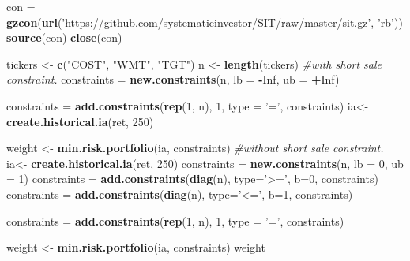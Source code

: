 \documentclass[]{article}
\newenvironment{Shaded}{\begin{snugshade}}{\end{snugshade}}
\newcommand{\CommentTok}[1]{\textcolor[rgb]{0.56,0.35,0.01}{\textit{#1}}}
\newcommand{\DataTypeTok}[1]{\textcolor[rgb]{0.13,0.29,0.53}{#1}}
\newcommand{\DecValTok}[1]{\textcolor[rgb]{0.00,0.00,0.81}{#1}}
\newcommand{\KeywordTok}[1]{\textcolor[rgb]{0.13,0.29,0.53}{\textbf{#1}}}
\newcommand{\NormalTok}[1]{#1}
\newcommand{\OperatorTok}[1]{\textcolor[rgb]{0.81,0.36,0.00}{\textbf{#1}}}
\newcommand{\OtherTok}[1]{\textcolor[rgb]{0.56,0.35,0.01}{#1}}
\newcommand{\StringTok}[1]{\textcolor[rgb]{0.31,0.60,0.02}{#1}}
\begin{document}
\begin{Shaded}
\begin{Highlighting}[]
\NormalTok{con =}\StringTok{ }\KeywordTok{gzcon}\NormalTok{(}\KeywordTok{url}\NormalTok{(}\StringTok{'https://github.com/systematicinvestor/SIT/raw/master/sit.gz'}\NormalTok{, }\StringTok{'rb'}\NormalTok{))}
\KeywordTok{source}\NormalTok{(con)}
\KeywordTok{close}\NormalTok{(con)}

\NormalTok{tickers <-}\StringTok{ }\KeywordTok{c}\NormalTok{(}\StringTok{"COST"}\NormalTok{, }\StringTok{"WMT"}\NormalTok{, }\StringTok{"TGT"}\NormalTok{)}
\NormalTok{n <-}\StringTok{ }\KeywordTok{length}\NormalTok{(tickers)}
\CommentTok{#with short sale constraint.}
\NormalTok{constraints =}\StringTok{ }\KeywordTok{new.constraints}\NormalTok{(n, }\DataTypeTok{lb =} \OperatorTok{-}\OtherTok{Inf}\NormalTok{, }\DataTypeTok{ub =} \OperatorTok{+}\OtherTok{Inf}\NormalTok{)}

\NormalTok{constraints =}\StringTok{ }\KeywordTok{add.constraints}\NormalTok{(}\KeywordTok{rep}\NormalTok{(}\DecValTok{1}\NormalTok{, n), }\DecValTok{1}\NormalTok{, }\DataTypeTok{type =} \StringTok{'='}\NormalTok{, constraints)        }
\NormalTok{ia<-}\StringTok{ }\KeywordTok{create.historical.ia}\NormalTok{(ret, }\DecValTok{250}\NormalTok{)}

\NormalTok{weight <-}\StringTok{ }\KeywordTok{min.risk.portfolio}\NormalTok{(ia, constraints)}
\CommentTok{#without short sale constraint.}
\NormalTok{ia<-}\StringTok{ }\KeywordTok{create.historical.ia}\NormalTok{(ret, }\DecValTok{250}\NormalTok{)}
\NormalTok{constraints =}\StringTok{ }\KeywordTok{new.constraints}\NormalTok{(n, }\DataTypeTok{lb =} \DecValTok{0}\NormalTok{, }\DataTypeTok{ub =} \DecValTok{1}\NormalTok{)}
\NormalTok{constraints =}\StringTok{ }\KeywordTok{add.constraints}\NormalTok{(}\KeywordTok{diag}\NormalTok{(n), }\DataTypeTok{type=}\StringTok{'>='}\NormalTok{, }\DataTypeTok{b=}\DecValTok{0}\NormalTok{, constraints)}
\NormalTok{constraints =}\StringTok{ }\KeywordTok{add.constraints}\NormalTok{(}\KeywordTok{diag}\NormalTok{(n), }\DataTypeTok{type=}\StringTok{'<='}\NormalTok{, }\DataTypeTok{b=}\DecValTok{1}\NormalTok{, constraints)}
    
\NormalTok{constraints =}\StringTok{ }\KeywordTok{add.constraints}\NormalTok{(}\KeywordTok{rep}\NormalTok{(}\DecValTok{1}\NormalTok{, n), }\DecValTok{1}\NormalTok{, }\DataTypeTok{type =} \StringTok{'='}\NormalTok{, constraints)  }

\NormalTok{weight <-}\StringTok{ }\KeywordTok{min.risk.portfolio}\NormalTok{(ia, constraints)}
\NormalTok{weight}
\end{Highlighting}
\end{Shaded}
\end{document}
